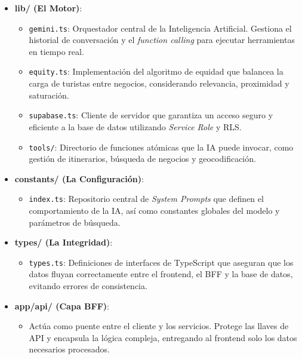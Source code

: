 \documentclass[11pt,a4paper]{article}
\newcommand{\tech}[1]{\texttt{\textcolor{primary}{#1}}}
\begin{document}
\begin{itemize}[leftmargin=*, itemsep=4pt]
  \item \textbf{lib/ (El Motor)}:
    \begin{itemize}[label=--]
      \item \tech{gemini.ts}: Orquestador central de la Inteligencia Artificial. Gestiona el historial de conversación y el \textit{function calling} para ejecutar herramientas en tiempo real.
      \item \tech{equity.ts}: Implementación del algoritmo de equidad que balancea la carga de turistas entre negocios, considerando relevancia, proximidad y saturación.
      \item \tech{supabase.ts}: Cliente de servidor que garantiza un acceso seguro y eficiente a la base de datos utilizando \textit{Service Role} y RLS.
      \item \tech{tools/}: Directorio de funciones atómicas que la IA puede invocar, como gestión de itinerarios, búsqueda de negocios y geocodificación.
    \end{itemize}
  \item \textbf{constants/ (La Configuración)}:
    \begin{itemize}[label=--]
      \item \tech{index.ts}: Repositorio central de \textit{System Prompts} que definen el comportamiento de la IA, así como constantes globales del modelo y parámetros de búsqueda.
    \end{itemize}
  \item \textbf{types/ (La Integridad)}:
    \begin{itemize}[label=--]
      \item \tech{types.ts}: Definiciones de interfaces de TypeScript que aseguran que los datos fluyan correctamente entre el frontend, el BFF y la base de datos, evitando errores de consistencia.
    \end{itemize}
  \item \textbf{app/api/ (Capa BFF)}:
    \begin{itemize}[label=--]
      \item Actúa como puente entre el cliente y los servicios. Protege las llaves de API y encapsula la lógica compleja, entregando al frontend solo los datos necesarios procesados.
    \end{itemize}
\end{itemize}

\end{document}
